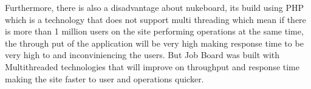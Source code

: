 Furthermore, there is also a disadvantage about nukeboard, its build using PHP which is a technology that does not support multi threading which mean if there is more than 1 million users on the site performing operations at the same time, the through put of the application will be very high making response time to be very high to and inconviniencing the users. But Job Board was built with Multithreaded technologies that will improve on throughput and response time making the site faster to user and operations quicker.  